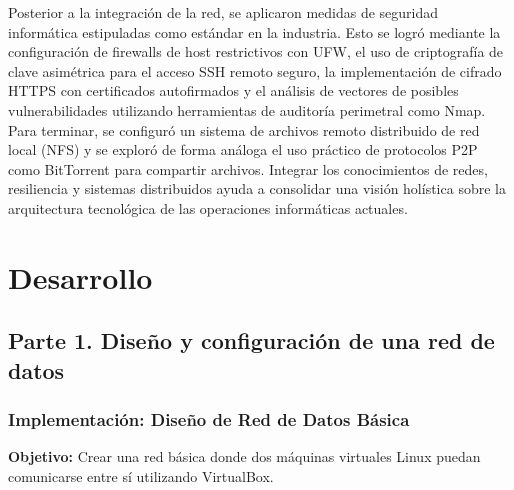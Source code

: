 \documentclass[12pt,a4paper]{report}
\begin{document}
Posterior a la integración de la red, se aplicaron medidas de seguridad informática estipuladas como estándar en la industria. Esto se logró mediante la configuración de firewalls de host restrictivos con UFW, el uso de criptografía de clave asimétrica para el acceso SSH remoto seguro, la implementación de cifrado HTTPS con certificados autofirmados y el análisis de vectores de posibles vulnerabilidades utilizando herramientas de auditoría perimetral como Nmap. Para terminar, se configuró un sistema de archivos remoto distribuido de red local (NFS) y se exploró de forma análoga el uso práctico de protocolos P2P como BitTorrent para compartir archivos. Integrar los conocimientos de redes, resiliencia y sistemas distribuidos ayuda a consolidar una visión holística sobre la arquitectura tecnológica de las operaciones informáticas actuales.

\chapter{Desarrollo}

\section{Parte 1. Diseño y configuración de una red de datos}

\subsection{Implementación: Diseño de Red de Datos Básica}
\textbf{Objetivo:} Crear una red básica donde dos máquinas virtuales Linux puedan comunicarse entre sí utilizando VirtualBox.
\end{document}
